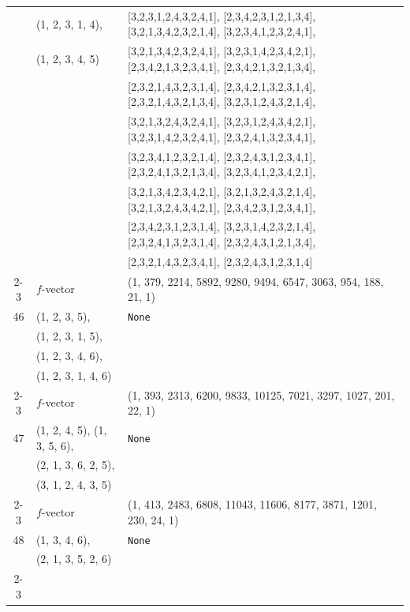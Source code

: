 \documentclass[10pt]{amsart}
\numberwithin{equation}{section}
\theoremstyle{plain}
\theoremstyle{definition}
\theoremstyle{remark}
\begin{document}
{\begin{longtable}{c|l|l}
		& (1, 2, 3, 1, 4), & [3,2,3,1,2,4,3,2,4,1], [2,3,4,2,3,1,2,1,3,4], [3,2,1,3,4,2,3,2,1,4], [3,2,3,4,1,2,3,2,4,1], \\
		& (1, 2, 3, 4, 5) & [3,2,1,3,4,2,3,2,4,1], [3,2,3,1,4,2,3,4,2,1], [2,3,4,2,1,3,2,3,4,1], [2,3,4,2,1,3,2,1,3,4], \\
		&  & [2,3,2,1,4,3,2,3,1,4], [2,3,4,2,1,3,2,3,1,4], [2,3,2,1,4,3,2,1,3,4], [3,2,3,1,2,4,3,2,1,4], \\
		&  & [3,2,1,3,2,4,3,2,4,1], [3,2,3,1,2,4,3,4,2,1], [3,2,3,1,4,2,3,2,4,1], [2,3,2,4,1,3,2,3,4,1], \\
		&  & [3,2,3,4,1,2,3,2,1,4], [2,3,2,4,3,1,2,3,4,1], [2,3,2,4,1,3,2,1,3,4], [3,2,3,4,1,2,3,4,2,1], \\
		&  & [3,2,1,3,4,2,3,4,2,1], [3,2,1,3,2,4,3,2,1,4], [3,2,1,3,2,4,3,4,2,1], [2,3,4,2,3,1,2,3,4,1], \\
		&  & [2,3,4,2,3,1,2,3,1,4], [3,2,3,1,4,2,3,2,1,4], [2,3,2,4,1,3,2,3,1,4], [2,3,2,4,3,1,2,1,3,4], \\
		&  & [2,3,2,1,4,3,2,3,4,1], [2,3,2,4,3,1,2,3,1,4] \\ \cline{2-3}
		
		& $f$-vector & {(1, 379, 2214, 5892, 9280, 9494, 6547, 3063, 954, 188, 21, 1)} \\
		\midrule
		
		46 & (1, 2, 3, 5), & \texttt{None} \\
		& (1, 2, 3, 1, 5), &  \\
		& (1, 2, 3, 4, 6), &  \\
		& (1, 2, 3, 1, 4, 6) &  \\ \cline{2-3}
		
		& $f$-vector & {(1, 393, 2313, 6200, 9833, 10125, 7021, 3297, 1027, 201, 22, 1)} \\
		\midrule
		
		47 & (1, 2, 4, 5), (1, 3, 5, 6), & \texttt{None} \\
		& (2, 1, 3, 6, 2, 5), &  \\
		& (3, 1, 2, 4, 3, 5) &  \\ \cline{2-3}
		
		& $f$-vector & {(1, 413, 2483, 6808, 11043, 11606, 8177, 3871, 1201, 230, 24, 1)} \\
		\midrule
		
		48 & (1, 3, 4, 6), & \texttt{None} \\
		& (2, 1, 3, 5, 2, 6) &  \\ \cline{2-3}
		

\end{longtable}}
\end{document}
